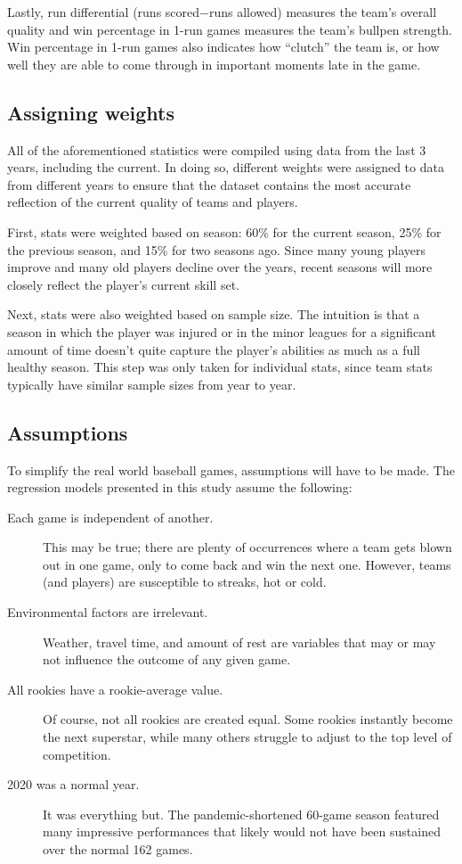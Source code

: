 \documentclass{paper}
\begin{document}
Lastly, run differential (runs scored$-$runs allowed) measures the team's overall quality and win percentage in 1-run games measures the team's bullpen strength. Win percentage in 1-run games also indicates how ``clutch'' the team is, or how well they are able to come through in important moments late in the game.

\subsection{Assigning weights}
All of the aforementioned statistics were compiled using data from the last 3 years, including the current. In doing so, different weights were assigned to data from different years to ensure that the dataset contains the most accurate reflection of the current quality of teams and players.

First, stats were weighted based on season: 60\% for the current season, 25\% for the previous season, and 15\% for two seasons ago. Since many young players improve and many old players decline over the years, recent seasons will more closely reflect the player's current skill set.

Next, stats were also weighted based on sample size. The intuition is that a season in which the player was injured or in the minor leagues for a significant amount of time doesn't quite capture the player's abilities as much as a full healthy season. This step was only taken for individual stats, since team stats typically have similar sample sizes from year to year.

\subsection{Assumptions}
To simplify the real world baseball games, assumptions will have to be made. The regression models presented in this study assume the following:

\begin{description}
\item[Each game is independent of another.] This may be true; there are plenty of occurrences where a team gets blown out in one game, only to come back and win the next one. However, teams (and players) are susceptible to streaks, hot or cold.
\item[Environmental factors are irrelevant.] Weather, travel time, and amount of rest are variables that may or may not influence the outcome of any given game.
\item[All rookies have a rookie-average value.] Of course, not all rookies are created equal. Some rookies instantly become the next superstar, while many others struggle to adjust to the top level of competition.
\item[2020 was a normal year.] It was everything but. The pandemic-shortened 60-game season featured many impressive performances that likely would not have been sustained over the normal 162 games.
\end{description}
\end{document}
